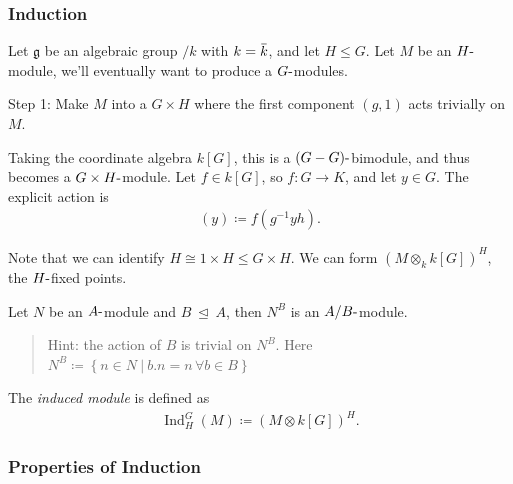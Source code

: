 \hypertarget{induction}{%
\subsubsection{Induction}\label{induction}}

Let \({\mathfrak{g}}\) be an algebraic group \(/k\) with
\(k = \mkern 1.5mu\overline{\mkern-1.5muk\mkern-1.5mu}\mkern 1.5mu\),
and let \(H \leq G\). Let \(M\) be an \(H{\hbox{-}}\)module, we'll
eventually want to produce a \(G{\hbox{-}}\)modules.

Step 1: Make \(M\) into a \(G\times H\) where the first component
\((g, 1)\) acts trivially on \(M\).

Taking the coordinate algebra \(k[G]\), this is a
\((G-G){\hbox{-}}\)bimodule, and thus becomes a
\(G\times H{\hbox{-}}\)module. Let \(f\in k[G]\), so \(f:G\to K\), and
let \(y\in G\). The explicit action is
\begin{align*}  
[(g, h) f] (y) \coloneqq f(g^{-1} y h)
.\end{align*}

Note that we can identify \(H\cong 1\times H \leq G\times H\). We can
form \((M\otimes_k k[G])^H\), the \(H{\hbox{-}}\)fixed points.

\begin{exercise}

Let \(N\) be an \(A{\hbox{-}}\)module and \(B{~\trianglelefteq~}A\),
then \(N^B\) is an \(A/B{\hbox{-}}\)module.

\begin{quote}
Hint: the action of \(B\) is trivial on \(N^B\). Here
\(N^B \coloneqq\left\{{n\in N {~\mathrel{\Big|}~}b.n = n\, \forall b\in B}\right\}\)
\end{quote}

\end{exercise}

\begin{definition}[Induction]

The \emph{induced module} is defined as
\begin{align*}  
\operatorname{Ind}_H^G(M) \coloneqq(M\otimes k[G])^H
.\end{align*}

\end{definition}

\hypertarget{properties-of-induction}{%
\subsubsection{Properties of Induction}\label{properties-of-induction}}

